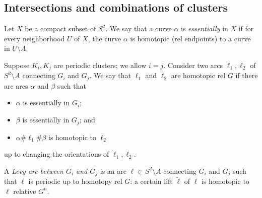 \documentclass{amsart}
\theoremstyle{plain}
\theoremstyle{definition}
\theoremstyle{remark}
\begin{document}
\subsection{Intersections and combinations of clusters}
Let $X$ be a compact subset of $S^2$. We say that a curve $\alpha$ is \emph{essentially} in $X$ if for every neighborhood $U$ of $X$, the curve $\alpha$ is homotopic (rel endpoints) to a curve in $U\setminus A$.   

Suppose $K_i, K_j$ are periodic clusters; we allow $i=j$. Consider two arcs $\ell_1,\ell_2$ of $S^2\setminus A$ connecting $G_i$ and $G_j$. We say that $\ell_1$ and $\ell_2$ are homotopic rel $G$ if there are arcs $\alpha$ and $\beta$ such that
\begin{itemize}
\item $\alpha$ is essentially in $G_i$;
\item $\beta$ is essentially in $G_j$; and
\item $\alpha\#\ell_1\#\beta$ is homotopic to $\ell_2$
\end{itemize}
 up to changing the orientations of $\ell_1,\ell_2$.

A \emph{Levy arc between $G_i$ and $G_j$} is an arc $\ell\subset S^2\setminus A$ connecting $ G_i$ and $ G_j$ such that $\ell$ is periodic up to homotopy rel $G$: a certain lift $\tilde \ell$ of $\ell$ is homotopic to $\ell$ relative $G^n$.
\end{document}
